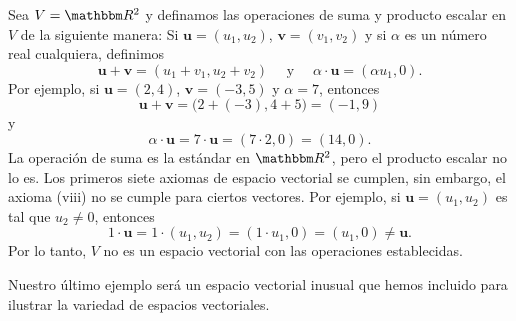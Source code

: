 \begin{examplebox}{}{}
    Sea $V = \RR[2]$ y definamos las operaciones de suma y producto escalar en $V$ de la siguiente manera: Si $\mathbf{u} = (u_1, u_2)$, $\mathbf{v} = (v_1, v_2)$ y si $\alpha$ es un número real cualquiera, definimos
    $$\mathbf{u} + \mathbf{v} = (u_1 + v_1, u_2 + v_2) \quad \text{ y } \quad \alpha \cdot \mathbf{u} = (\alpha u_1, 0).$$
    Por ejemplo, si $\mathbf{u} = (2, 4)$, $\mathbf{v} = (-3, 5)$ y $\alpha = 7$, entonces
    $$\mathbf{u} + \mathbf{v} = \big(2 + (-3), 4 + 5\big) = (-1, 9)$$
    y
    $$\alpha \cdot \mathbf{u} = 7 \cdot \mathbf{u} = (7 \cdot 2, 0) = (14, 0).$$
    La operación de suma es la estándar en $\RR[2]$, pero el producto escalar no lo es. Los primeros siete axiomas de espacio vectorial se cumplen, sin embargo, el axioma (viii) no se cumple para ciertos vectores. Por ejemplo, si $\mathbf{u} = (u_1, u_2)$ es tal que $u_2 \neq 0$, entonces
    $$1 \cdot \mathbf{u} = 1 \cdot (u_1, u_2) = (1 \cdot u_1, 0) = (u_1, 0) \neq \mathbf{u}.$$
    Por lo tanto, $V$ no es un espacio vectorial con las operaciones establecidas.
\end{examplebox}

\newpage

Nuestro último ejemplo será un espacio vectorial inusual que hemos incluido para ilustrar la variedad de espacios vectoriales.

